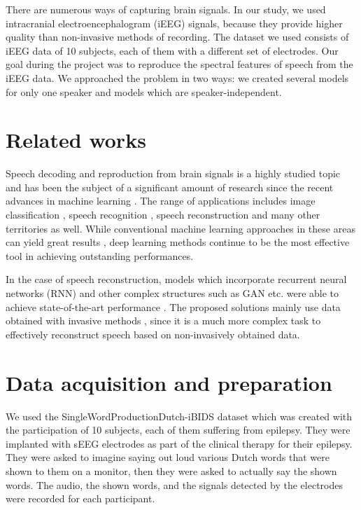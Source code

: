 \documentclass{article}
\begin{document}
There are numerous ways of capturing brain signals. In our study, we used intracranial electroencephalogram (iEEG) signals, because they provide higher quality than non-invasive methods of recording. The dataset we used consists of iEEG data of 10 subjects, each of them with a different set of electrodes. Our goal during the project was to reproduce the spectral features of speech from the iEEG data. We approached the problem in two ways: we created several models for only one speaker and models which are speaker-independent.

\section{Related works}

Speech decoding and reproduction from brain signals is a highly studied topic and has been the subject of a significant amount of research since the recent advances in machine learning \cite{review2}. The range of applications includes image classification \cite{imgclass}, speech recognition \cite{class1, class2}, speech reconstruction \cite{speechrec} and many other territories as well. While conventional machine learning approaches in these areas can yield great results \cite{svm}, deep learning methods continue to be the most effective tool in achieving outstanding performances.

In the case of speech reconstruction, models which incorporate recurrent neural networks (RNN) \cite{rnn1} and other complex structures such as GAN \cite{sota1} etc. were able to achieve state-of-the-art performance \cite{sota2}. The proposed solutions mainly use data obtained with invasive methods \cite{conv1}, since it is a much more complex task
to effectively reconstruct speech based on non-invasively obtained data.


\section{Data acquisition and preparation}

We used the SingleWordProductionDutch-iBIDS dataset \cite{dataset} which was created with the participation of 10 subjects, each of them suffering from epilepsy. They were implanted with sEEG electrodes as part of the clinical therapy for their epilepsy. They were asked to imagine saying out loud various Dutch words that were shown to them on a monitor, then they were asked to actually say the shown words. The audio, the shown words, and the signals detected by the electrodes were recorded for each participant.
\end{document}
